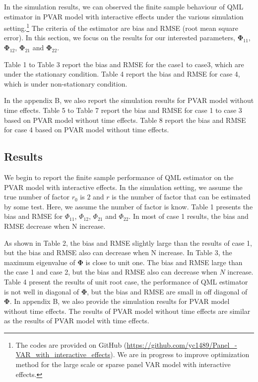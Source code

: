 \documentclass[12pt,a4paper,hyperref]{article}
\begin{document}
In the simulation results, we can observed the finite sample behaviour of QML estimator in PVAR model with interactive effects under the various simulation setting.\footnote{The codes are provided on GitHub (\url{https://github.com/yc1489/Panel_-VAR_with_interactive_effects}). We are in progress to improve optimization method for the large scale or sparse panel VAR model with interactive effects. } The criteria of the estimator are bias and RMSE (root mean square error). In this section, we focus on the results for our interested parameters, $\boldsymbol{\Phi}_{11}$, $\boldsymbol{\Phi}_{12}$, $\boldsymbol{\Phi}_{21}$ and $\boldsymbol{\Phi}_{22}$.



Table 1 to Table 3 report the bias and RMSE for the case1 to case3, which are under the stationary condition. Table 4  report the bias and RMSE for case 4, which is under non-stationary condition.

In the appendix B, we also report the simulation results for PVAR model without time effects. Table 5 to  Table 7 report the bias and RMSE for case 1 to case 3 based on PVAR model without time effects.
Table 8 report  the bias and RMSE for case 4 based on PVAR model without time effects.


\subsection{Results}


We begin to report the finite sample performance of QML estimator  on the PVAR model with interactive effects.  In the simulation setting, we assume the true number of factor $r_{0}$ is $2$ and $r$ is the number of factor that can be estimated by  some test. Here, we assume the number of factor is know. Table 1 presents the bias and RMSE for $\Phi_{11}$,  $\Phi_{12}$, $\Phi_{21}$ and $\Phi_{22}$.  In most of case 1 results, the bias and RMSE decrease when N increase.

As shown in Table 2, the bias and RMSE slightly large than the results of case 1, but the bias and RMSE also can decrease when N increase. In Table 3, the maximum eigenvalue of $\boldsymbol{\Phi}$ is close to unit one. The bias and RMSE large than the case 1 and case 2, but the bias and RMSE also can decrease when $N$ increase.  Table 4 present the results of unit root case, the performance of QML estimator is not well in diagonal of $\boldsymbol{\Phi}$, but the bias and RMSE are small in off diagonal of $\boldsymbol{\Phi}$.
In appendix B, we also provide the simulation results for PVAR model without time effects. The results of PVAR model without time effects are similar as the results of PVAR model with time effects.
\end{document}
